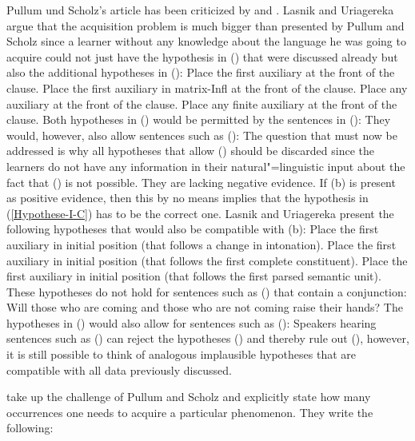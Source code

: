 Pullum und Scholz's article has been criticized by \citet{LU2002a} and \citet{LY2002a}. Lasnik and Uriagereka argue that the acquisition
problem is much bigger than presented by Pullum and Scholz since a learner without any knowledge about the language he was going to acquire
could not just have the hypothesis in () that were discussed already but also the additional hypotheses in ():
\eal
\label{Hilfsverbhypothesen}
\ex Place the first auxiliary at the front of the clause.
\ex\label{Hypothese-I-C} 
Place the first auxiliary in matrix-Infl at the front of the clause.
\zl
\eal
\ex Place any auxiliary at the front of the clause.
\ex Place any finite auxiliary at the front of the clause.
\zl
Both hypotheses in () would be permitted by the sentences in ():
\eal
{}
\zl
They would, however, also allow sentences such as  ():
\z
The question that must now be addressed is why all hypotheses that allow () should be discarded since the learners do
not have any information in their natural"=linguistic input about the fact that () is not possible. They are lacking
negative evidence. If (b) is present as positive evidence, then this by no means implies
that the hypothesis in (\ref{Hypothese-I-C}) has to be the correct one. Lasnik and Uriagereka present the following hypotheses
that would also be compatible with (b):
\eal
\ex Place the first auxiliary in initial position (that follows a change in intonation).
\ex Place the first auxiliary in initial position (that follows the first complete constituent).
\ex Place the first auxiliary in initial position (that follows the first parsed semantic unit).
\zl
These hypotheses do not hold for sentences such as () that contain a conjunction:
\ea
\label{Beispiel-Hilfsverbvoranstellung-Koordination}
Will those who are coming and those who are not coming raise their hands?
\z
The hypotheses in () would also allow for sentences such as ():
\z
Speakers hearing sentences such as () can reject the hypotheses () and thereby rule out (), however, it is still possible
to think of analogous implausible hypotheses that are compatible with all data previously discussed.

\citet{LY2002a} take up the challenge of Pullum and Scholz and explicitly state how many occurrences one needs to acquire a particular phenomenon.
They write the following:

